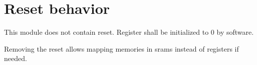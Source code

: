 \section{Reset behavior}

This module does not contain reset. Register shall be initialized to 0 by software.

Removing the reset allows mapping memories in srams instead of registers if needed. 




